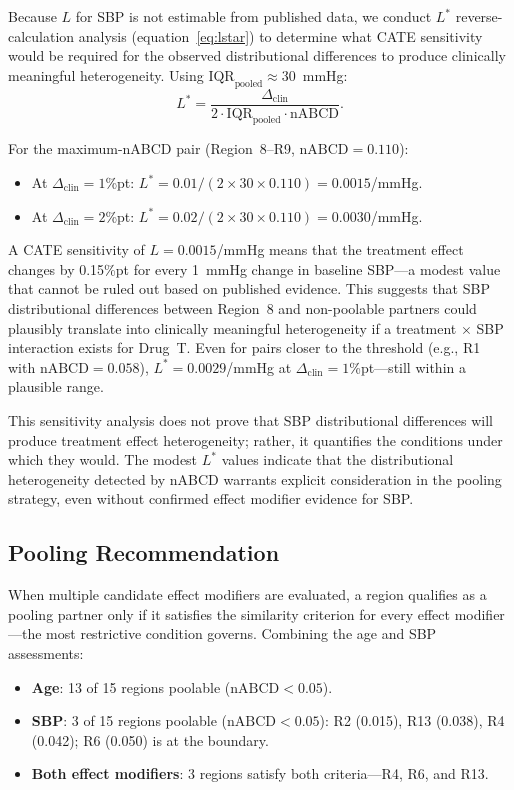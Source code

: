 Because $L$ for SBP is not estimable from published data, we conduct $L^*$ reverse-calculation analysis (equation~\ref{eq:lstar}) to determine what CATE sensitivity would be required for the observed distributional differences to produce clinically meaningful heterogeneity. Using $\text{IQR}_{\text{pooled}} \approx 30$~mmHg:
\[
L^* = \frac{\Delta_{\text{clin}}}{2 \cdot \text{IQR}_{\text{pooled}} \cdot \text{nABCD}}.
\]

For the maximum-nABCD pair (Region~8--R9, $\text{nABCD} = 0.110$):
\begin{itemize}
  \item At $\Delta_{\text{clin}} = 1$\%pt: $L^* = 0.01 / (2 \times 30 \times 0.110) = 0.0015$/mmHg.
  \item At $\Delta_{\text{clin}} = 2$\%pt: $L^* = 0.02 / (2 \times 30 \times 0.110) = 0.0030$/mmHg.
\end{itemize}

A CATE sensitivity of $L = 0.0015$/mmHg means that the treatment effect changes by 0.15\%pt for every 1~mmHg change in baseline SBP---a modest value that cannot be ruled out based on published evidence. This suggests that SBP distributional differences between Region~8 and non-poolable partners could plausibly translate into clinically meaningful heterogeneity if a treatment $\times$ SBP interaction exists for Drug~T. Even for pairs closer to the threshold (e.g., R1 with $\text{nABCD} = 0.058$), $L^* = 0.0029$/mmHg at $\Delta_{\text{clin}} = 1$\%pt---still within a plausible range.

This sensitivity analysis does not prove that SBP distributional differences will produce treatment effect heterogeneity; rather, it quantifies the conditions under which they would. The modest $L^*$ values indicate that the distributional heterogeneity detected by nABCD warrants explicit consideration in the pooling strategy, even without confirmed effect modifier evidence for SBP.

\subsection{Pooling Recommendation}\label{sec:app_pooling}

When multiple candidate effect modifiers are evaluated, a region qualifies as a pooling partner only if it satisfies the similarity criterion for every effect modifier---the most restrictive condition governs. Combining the age and SBP assessments:

\begin{itemize}
  \item \textbf{Age}: 13 of 15 regions poolable ($\text{nABCD} < 0.05$).
  \item \textbf{SBP}: 3 of 15 regions poolable ($\text{nABCD} < 0.05$): R2 (0.015), R13 (0.038), R4 (0.042); R6 (0.050) is at the boundary.
  \item \textbf{Both effect modifiers}: 3 regions satisfy both criteria---R4, R6, and R13.
\end{itemize}

